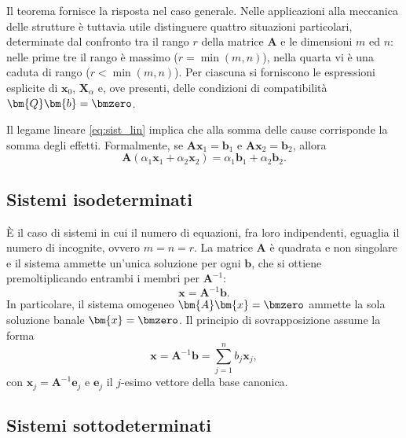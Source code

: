 Il teorema fornisce la risposta nel caso generale. Nelle applicazioni alla meccanica delle strutture è tuttavia utile distinguere quattro situazioni particolari, determinate dal confronto tra il rango $r$ della matrice $\bm{A}$ e le dimensioni $m$ ed $n$: nelle prime tre il rango è massimo ($r=\min(m,n)$), nella quarta vi è una caduta di rango ($r<\min(m,n)$). Per ciascuna si forniscono le espressioni esplicite di $\bm{x}_0$, $\bm{X}_\alpha$ e, ove presenti, delle condizioni di compatibilità $\bm{Q}\bm{b}=\bmzero$.


\begin{oss}
	Il legame lineare \eqref{eq:sist_lin} implica che alla somma delle cause corrisponde la somma degli effetti. Formalmente, se $\bm{A}\bm{x}_1 = \bm{b}_1$ e $\bm{A}\bm{x}_2 = \bm{b}_2$, allora
	\begin{equation}
		\bm{A}(\alpha_1\bm{x}_1 + \alpha_2\bm{x}_2) = \alpha_1\bm{b}_1 + \alpha_2\bm{b}_2.
	\end{equation}
\end{oss}


\subsection{Sistemi isodeterminati}\label{par:isodeterminati}


È il caso di sistemi in cui il numero di equazioni, fra loro
indipendenti, eguaglia il numero di incognite, ovvero $m=n=r$.
La matrice $\bm{A}$ è quadrata e non singolare e il sistema
ammette un'unica soluzione per ogni $\bm{b}$, che si ottiene
premoltiplicando entrambi i membri per $\bm{A}^{-1}$:
\begin{equation}\label{sol_iso}
	\bm{x}=\bm{A}^{-1} \bm{b}.
\end{equation}
In particolare, il sistema omogeneo $\bm{A}\bm{x}=\bmzero$ ammette
la sola soluzione banale $\bm{x}=\bmzero$. Il principio di
sovrapposizione assume la forma
\begin{equation}
	\bm{x} = \bm{A}^{-1}\bm{b} = \sum_{j=1}^n b_j \bm{x}_j ,
\end{equation}
con $\bm{x}_j = \bm{A}^{-1}\bm{e}_j$ e $\bm{e}_j$ il $j$-esimo
vettore della base canonica.



\subsection{Sistemi sottodeterminati}\label{par:sottodeterminati}

